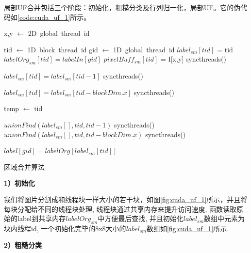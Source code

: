 \documentclass[a4paper, 11pt]{article}
\begin{document}
局部UF合并包括三个阶段：初始化，粗糙分类及行列归一化，局部UF。它的伪代码如\ref{code:cuda_uf_1}所示。

\begin{algorithm}[H]
	\DontPrintSemicolon
	x,y $\gets$ 2D\ global\ thread\ id \;

	tid $\gets$ 1D\ block\ thread\ id\;
	gid $\gets$ 1D\ global\ thread\ id\;
	$label_{sm}[tid]$ = tid\;
	$labelOrg_{sm}[tid]  = labelIn[gid]$
	$pixelBuff_{sm}[tid]$ = I[x,y]\;
	syncthreads()\;
	
	 {
		$label_{sm}[tid] = label_{sm}[tid-1]$\;
	}
	syncthreads()\;

	 {
		$label_{sm}[tid] = label_{sm}[tid-blockDim.x]$\;
	}
	syncthreads()\;
	
	temp $\gets$ tid\;
	
	 {
		$unionFind(label_{sm}[], tid, tid-1)$\;
	}
	syncthreads()\;
	 {
		$unionFind(label_{sm}[], tid, tid-blockDim.x)$\;
	}
	syncthreads()\;
	
	$label[gid] = labelOrg[label_{sm}[tid]]$\;
	\caption{区域合并算法}
	\label{code:cuda_uf_1}
\end{algorithm}

\clearpage
\textbf{1）初始化}

我们将图片分割成和线程块一样大小的若干块，如图\ref{fig:cuda_uf_1}所示，并且将每块分配给不同的线程块处理, 线程块通过共享内存来提升访问速度\autocite{cuda-toolkit-doc}, 函数读取原始的label到共享内存$labelOrg_{sm}$中方便最后查找, 并且初始化$label_{sm}$数组中元素为块内线程id, 一个初始化完毕的8x8大小的$label_{sm}$数组如\ref{fig:cuda_uf_1}所示.

\textbf{2）粗糙分类}
\end{document}
